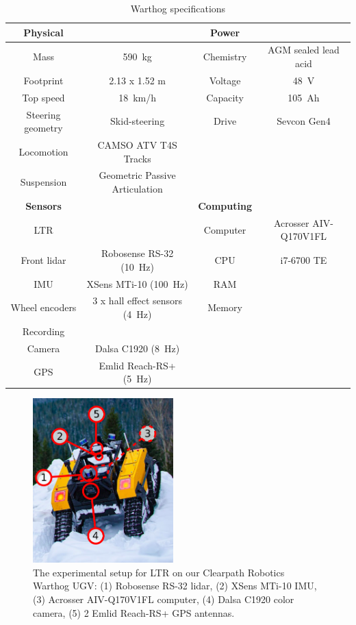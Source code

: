 \begin{table}[htpb]
	\caption{Warthog specifications} \label{tab:warthog_specs}
	\begin{center}
		\begin{tabular}{c c | c c}
			\textbf{Physical} &  & \textbf{Power} & \\
			\hline
			Mass & \SI{590}{kg} & Chemistry & AGM sealed lead acid \\ 
			Footprint & 2.13 x 1.52 m & Voltage & \SI{48}{V} \\ 
			Top speed & \SI{18}{km/h} & Capacity & \SI{105}{Ah} \\ 
			Steering geometry & Skid-steering  & Drive & Sevcon Gen4 \\
			Locomotion & CAMSO ATV T4S Tracks \\
			Suspension & Geometric Passive Articulation \\
			\hline
			\textbf{Sensors} & & \textbf{Computing} \\
			\hline
			\ac{LTR} & & Computer & Acrosser AIV-Q170V1FL  \\
			Front lidar & Robosense RS-32 (\SI{10}{Hz}) & CPU & i7-6700 TE \\
			\ac{IMU} & XSens MTi-10 (\SI{100}{Hz}) & RAM \\ 
			Wheel encoders & 3 x hall effect sensors (\SI{4}{Hz}) & Memory \\
			Recording & &   \\
			Camera & Dalsa C1920 (\SI{8}{Hz})  \\
			\ac{GPS} & Emlid Reach-RS+ (\SI{5}{Hz}) \\
		\end{tabular}
	\end{center}
\end{table}

\begin{figure}
	\centering
	\includegraphics[height=2.5in]{figs/warthog_hardware.pdf}
	\caption{The experimental setup for \ac{LTR} on our Clearpath Robotics Warthog \ac{UGV}: (1) Robosense RS-32 lidar, (2) XSens MTi-10 \ac{IMU}, (3) Acrosser AIV-Q170V1FL computer, (4) Dalsa C1920 color camera, (5) 2 Emlid Reach-RS+ \ac{GPS} antennas.}
	\label{fig:warthog}
\end{figure}
